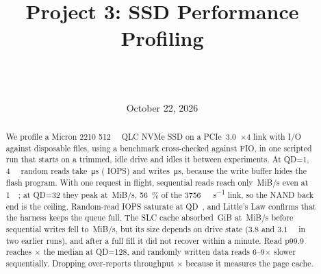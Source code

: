 \documentclass[11pt]{article}
\title{Project 3: SSD Performance Profiling}
\author{\acsauthor\\[2pt]\small\acscourse\\\small\href{mailto:\acsemail}{\acsemail}}
\date{October 22, 2026}
\begin{document}
\maketitle

\begin{abstract}
  We profile a Micron 2210 \qty{512}{\giga\byte} QLC NVMe SSD on a PCIe~3.0~$\times$4 link with
   I/O against disposable files, using a  benchmark cross-checked against FIO,
  in one scripted run that starts on a trimmed, idle drive and idles it between experiments.
  At QD=1, \qty{4}{\kibi\byte} random reads take
  \,\si{\micro\second}
  ( IOPS) and writes
  \,\si{\micro\second}, because the
  write buffer hides the flash program. With one request in flight, sequential reads reach only
  \,MiB/s even at
  \qty{1}{\mebi\byte}; at QD=32 they peak at
  \,MiB/s, \qty{56}{\percent} of
  the \qty{3756}{\mebi\byte\per\second} link, so the NAND back end is the ceiling. Random-read IOPS
  saturate at QD~, and Little's Law confirms that the harness
  keeps the queue full. The SLC cache absorbed
  \,GiB at \,MiB/s before
  sequential writes fell to \,MiB/s, but its size depends on
  drive state (\qty{3.8}{} and \qty{3.1}{\gibi\byte} in two earlier runs), and after a full fill it did not
  recover within a minute. Read p99.9 reaches $\times$ the median at QD=128, and
  randomly written data reads 6--9$\times$ slower sequentially. Dropping  over-reports
  throughput
  \csvget{}\csvget{}%
  \ssdratio[0]{\ssdBuf}{\ssdDir}$\times$ because it measures the page cache.
\end{abstract}

\ifacsdraft\setcounter{tocdepth}{1}{\small\tableofcontents}\clearpage\fi















\printbibliography

\appendix

\end{document}
